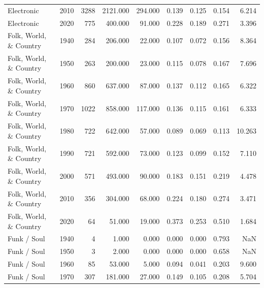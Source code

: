 \begin{table}
{\begin{tabular}{lrrrrrrrr}
            Electronic &           2010 &       3288 & 2121.000 &  294.000 &        0.139 &  0.125 &  0.154 &                  6.214 \\
            Electronic &           2020 &        775 &  400.000 &   91.000 &        0.228 &  0.189 &  0.271 &                  3.396 \\
Folk, World, \& Country &           1940 &        284 &  206.000 &   22.000 &        0.107 &  0.072 &  0.156 &                  8.364 \\
Folk, World, \& Country &           1950 &        263 &  200.000 &   23.000 &        0.115 &  0.078 &  0.167 &                  7.696 \\
Folk, World, \& Country &           1960 &        860 &  637.000 &   87.000 &        0.137 &  0.112 &  0.165 &                  6.322 \\
Folk, World, \& Country &           1970 &       1022 &  858.000 &  117.000 &        0.136 &  0.115 &  0.161 &                  6.333 \\
Folk, World, \& Country &           1980 &        722 &  642.000 &   57.000 &        0.089 &  0.069 &  0.113 &                 10.263 \\
Folk, World, \& Country &           1990 &        721 &  592.000 &   73.000 &        0.123 &  0.099 &  0.152 &                  7.110 \\
Folk, World, \& Country &           2000 &        571 &  493.000 &   90.000 &        0.183 &  0.151 &  0.219 &                  4.478 \\
Folk, World, \& Country &           2010 &        356 &  304.000 &   68.000 &        0.224 &  0.180 &  0.274 &                  3.471 \\
Folk, World, \& Country &           2020 &         64 &   51.000 &   19.000 &        0.373 &  0.253 &  0.510 &                  1.684 \\
           Funk / Soul &           1940 &          4 &    1.000 &    0.000 &        0.000 &  0.000 &  0.793 &                    NaN \\
           Funk / Soul &           1950 &          3 &    2.000 &    0.000 &        0.000 &  0.000 &  0.658 &                    NaN \\
           Funk / Soul &           1960 &         85 &   53.000 &    5.000 &        0.094 &  0.041 &  0.203 &                  9.600 \\
           Funk / Soul &           1970 &        307 &  181.000 &   27.000 &        0.149 &  0.105 &  0.208 &                  5.704 \\

\end{tabular}}
\end{table}
